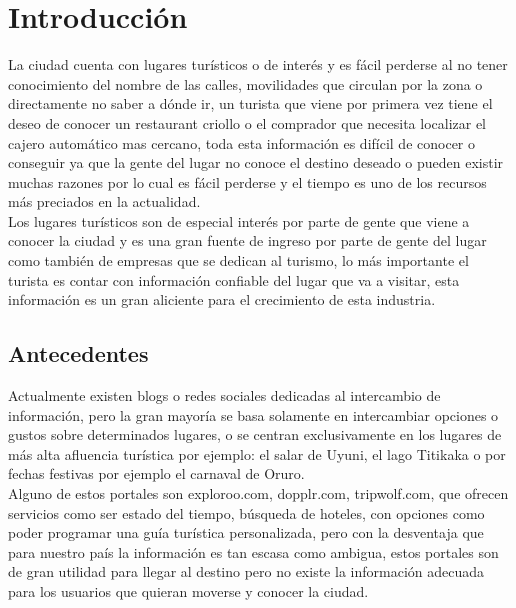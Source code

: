 \chapter{Introducci\'on} %
\label{cha:introduccion}

  La ciudad cuenta con lugares turísticos o de interés y es fácil perderse al no 
  tener conocimiento del nombre de las calles, movilidades que circulan por la 
  zona o directamente no saber a dónde ir, un turista que viene por primera vez 
  tiene el deseo de conocer un restaurant criollo   o el comprador que necesita 
  localizar el cajero automático mas cercano, toda esta información es difícil de 
  conocer o conseguir ya que la gente del lugar no conoce el destino deseado o  
  pueden existir muchas razones por lo cual es fácil perderse y  el tiempo es uno 
  de los recursos  más preciados en la actualidad.\\

  Los lugares turísticos son de especial interés por parte de gente que viene a 
  conocer la ciudad y es una gran fuente de ingreso por parte de gente del lugar 
  como también de empresas que se dedican al turismo, lo más importante el 
  turista es contar con información confiable del lugar que va a visitar, esta 
  información es un gran aliciente para el crecimiento de esta industria.

  \section{Antecedentes} %
  \label{sec:antecedentes}
    Actualmente existen blogs o redes sociales dedicadas al intercambio de 
    información, pero  la gran mayoría se basa solamente en intercambiar opciones 
    o gustos sobre determinados lugares, o se centran exclusivamente en los 
    lugares de más alta afluencia turística por ejemplo: el salar de Uyuni, el 
    lago Titikaka o por fechas festivas por ejemplo el carnaval de Oruro.\\ 

    Alguno de estos portales son  exploroo.com, dopplr.com, tripwolf.com, que 
    ofrecen servicios como ser estado del tiempo, búsqueda de hoteles, con 
    opciones como poder programar una guía turística personalizada, pero con la 
    desventaja que para nuestro país la información es tan escasa como ambigua, 
    estos portales son de gran utilidad para llegar al destino pero no existe la 
    información adecuada para los usuarios que quieran moverse  y conocer la ciudad.

